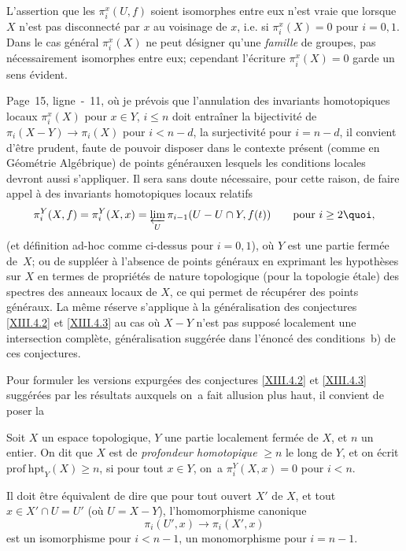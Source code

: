 L'assertion que les $\pi_i^x(U, f)$ soient isomorphes entre eux n'est vraie que lorsque $X$ n'est pas disconnect\'e par $x$ au voisinage de $x$, i.e. si $\pi_i^x(X)=0$ pour $i=0, 1$. Dans le cas g\'en\'eral $\pi_i^x(X)$ ne peut d\'esigner qu'une \emph{famille} de groupes, pas n\'ecessairement isomorphes entre eux; cependant l'\'ecriture $\pi_i^x(X)=0$ garde un sens \'evident.

\label{p26y}Page~15, ligne~-~11, o\`u je pr\'evois que l'annulation des invariants homotopiques locaux $\pi_i^x(X)$ pour $x\in Y$, $i\leq n$ doit entra\^iner la bijectivit\'e de $\pi_i(X-Y)\to\pi_i(X)$ pour $i<n-d$, la surjectivit\'e pour $i=n-d$, il convient d'\^etre prudent, faute de pouvoir disposer dans le contexte pr\'esent (comme en G\'eom\'etrie Alg\'ebrique) de points \og g\'en\'eraux\fg en lesquels les conditions locales devront aussi s'appliquer. Il sera sans doute n\'ecessaire, pour cette raison, de faire appel \`a des invariants homotopiques locaux relatifs
$$
\pi_i^Y(X, f)=\pi_i^Y(X, x)=\varprojlim_U \pi_{i-1}(U-U\cap Y, f(t))\qquad\text{pour }i\geq 2\quoi,
$$
(et d\'efinition {ad-hoc} comme ci-dessus pour $i=0, 1$), o\`u $Y$ est une partie ferm\'ee de~$X$; ou de suppl\'eer \`a l'absence de points g\'en\'eraux en exprimant les hypoth\`eses sur $X$ en termes de propri\'et\'es de nature topologique (pour la topologie \'etale) des spectres des anneaux locaux de $X$, ce qui permet de r\'ecup\'erer des points g\'en\'eraux. La m\^eme r\'eserve s'applique \`a la g\'en\'eralisation des conjectures \ref{XIII.4.2} et \ref{XIII.4.3} au cas o\`u $X-Y$ n'est pas suppos\'e localement une intersection compl\`ete, g\'en\'eralisation sugg\'er\'ee dans l'\'enonc\'e des conditions~b) de ces conjectures.

Pour formuler les versions expurg\'ees des conjectures \ref{XIII.4.2} et \ref{XIII.4.3} sugg\'er\'ees par les r\'esultats auxquels on~a fait allusion plus haut, il convient de poser la

\begin{supdefinition} \label{XIII.6.1} Soit $X$ un espace topologique, $Y$ une partie localement ferm\'ee de $X$, et $n$ un entier. On dit que $X$ est de \emph{profondeur homotopique} $\geq n$ le long de $Y$, et on \'ecrit $\mathrm{prof\:hpt}_Y(X)\geq n$, si pour tout $x\in Y$, on~a $\pi_i^Y(X, x)=0$ pour $i<n$.
\end{supdefinition}

Il doit \^etre \'equivalent de dire que pour tout ouvert $X'$ de $X$, et tout $x\in X'\cap U=U'$ (o\`u $U=X-Y$), l'homomorphisme canonique
$$
\pi_i(U', x)\to\pi_i(X', x)$$
est un isomorphisme pour $i<n-1$, un monomorphisme pour $i=n-1$.


